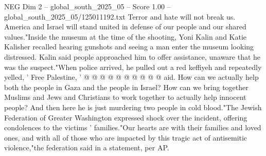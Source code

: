 \begin{textsample}{NEG Dim 2 – global\_south\_2025\_05 – Score 1.00 – global\_south\_2025\_05/125011192.txt}
Terror and hate will not break us.
America and Israel will stand united in defense of our people and our shared values."Inside the museum at the time of the shooting, Yoni Kalin and Katie Kalisher recalled hearing gunshots and seeing a man enter the museum looking distressed.
Kalin said people approached him to offer assistance, unaware that he was the suspect."When police arrived, he pulled out a red keffiyeh and repeatedly yelled, ' Free Palestine, ' @ @ @ @ @ @ @ @ @ @ aid.
How can we actually help both the people in Gaza and the people in Israel?
How can we bring together Muslims and Jews and Christians to work together to actually help innocent people?
And then here he is just murdering two people in cold blood."The Jewish Federation of Greater Washington expressed shock over the incident, offering condolences to the victims ' families."Our hearts are with their families and loved ones, and with all of those who are impacted by this tragic act of antisemitic violence,"the federation said in a statement, per AP.

\end{textsample}
